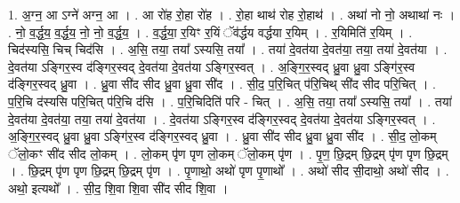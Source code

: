 \documentclass[17pt]{extarticle}
\begin{document}
1. अ॒ग्न॒ आ ऽग्ने॑ अग्न॒ आ । . आ रो॑ह रो॒हा रो॑ह । . रो॒हा थाथ॑ रोह रो॒हाथ॑ । . अथा॑ नो नो॒ अथाथा॑ नः । . नो॒ व॒र्द्ध॒य॒ व॒र्द्ध॒य॒ नो॒ नो॒ व॒र्द्ध॒य॒ । . व॒र्द्ध॒या॒ र॒यिꣳ र॒यिं ॅव॑र्द्धय वर्द्धया र॒यिम् । . र॒यिमिति॑ र॒यिम् । . चिद॑स्यसि॒ चिच् चिद॑सि । . अ॒सि॒ तया॒ तया᳚ ऽस्यसि॒ तया᳚ । . तया॑ दे॒वत॑या दे॒वत॑या॒ तया॒ तया॑ दे॒वत॑या । . दे॒वत॑या ऽङ्गिर॒स्व द॑ङ्गिर॒स्वद् दे॒वत॑या दे॒वत॑या ऽङ्गिर॒स्वत् । . अ॒ङ्गि॒र॒स्वद् ध्रु॒वा ध्रु॒वा ऽङ्गि॑र॒स्व द॑ङ्गिर॒स्वद् ध्रु॒वा । . ध्रु॒वा सी॑द सीद ध्रु॒वा ध्रु॒वा सी॑द । . सी॒द॒ प॒रि॒चित् प॑रि॒चिथ् सी॑द सीद परि॒चित् । . प॒रि॒चि द॑स्यसि परि॒चित् प॑रि॒चि द॑सि । . प॒रि॒चिदिति॑ परि - चित् । . अ॒सि॒ तया॒ तया᳚ ऽस्यसि॒ तया᳚ । . तया॑ दे॒वत॑या दे॒वत॑या॒ तया॒ तया॑ दे॒वत॑या । . दे॒वत॑या ऽङ्गिर॒स्व द॑ङ्गिर॒स्वद् दे॒वत॑या दे॒वत॑या ऽङ्गिर॒स्वत् । . अ॒ङ्गि॒र॒स्वद् ध्रु॒वा ध्रु॒वा ऽङ्गि॑र॒स्व द॑ङ्गिर॒स्वद् ध्रु॒वा । . ध्रु॒वा सी॑द सीद ध्रु॒वा ध्रु॒वा सी॑द । . सी॒द॒ लो॒कम् ॅलो॒कꣳ सी॑द सीद लो॒कम् । . लो॒कम् पृ॑ण पृण लो॒कम् ॅलो॒कम् पृ॑ण । . पृ॒ण॒ छि॒द्रम् छि॒द्रम् पृ॑ण पृण छि॒द्रम् । . छि॒द्रम् पृ॑ण पृण छि॒द्रम् छि॒द्रम् पृ॑ण । . पृ॒णाथो॒ अथो॑ पृण पृ॒णाथो᳚ । . अथो॑ सीद सी॒दाथो॒ अथो॑ सीद । . अथो॒ इत्यथो᳚ । . सी॒द॒ शि॒वा शि॒वा सी॑द सीद शि॒वा । \newline
\end{document}

